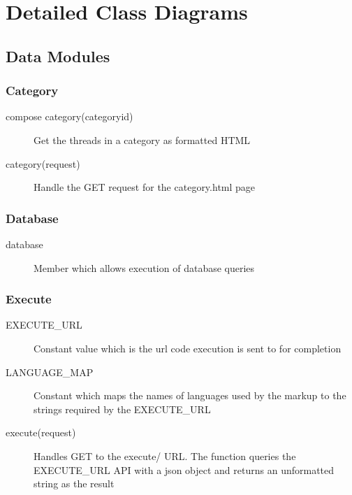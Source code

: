 \documentclass[12pt]{scrartcl}
\begin{document}


\newpage\null\thispagestyle{empty}\newpage

\tableofcontents

\newpage\null\thispagestyle{empty}\newpage

\section{Detailed Class Diagrams}
\subsection{Data Modules}
\subsubsection{Category}

\begin{description}
\item [compose category(categoryid)] Get the threads in a category as formatted HTML
\item [category(request)] Handle the GET request for the category.html page
\end{description}

\subsubsection{Database}
\begin{description}
\item [database] Member which allows execution of database queries 
\end{description}

\subsubsection{Execute}
\begin{description}
\item [EXECUTE\_URL] Constant value which is the url code execution is sent to for completion
\item [LANGUAGE\_MAP ] Constant which maps the names of languages used by the markup to the strings required by the EXECUTE\_URL
\item[execute(request)] Handles GET to the execute/ URL. The function queries the EXECUTE\_URL API with a json object and returns an unformatted string as the result
\end{description}
\end{document}

